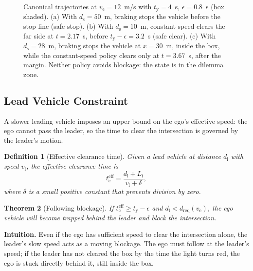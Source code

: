 \documentclass[conference, a4paper]{IEEEtran}
\theoremstyle{plain}
\newtheorem{theorem}{Theorem}
\newtheorem{definition}[theorem]{Definition}
\newcommand{\dreq}{d_{\mathrm{req}}}
\newcommand{\ds}{d_{\mathrm{s}}}
\newcommand{\dl}{d_{\mathrm{l}}}
\newcommand{\tred}{t_{\mathrm{y}}}
\newcommand{\teff}{t_{\mathrm{c}}^{\mathrm{eff}}}
\newcommand{\Li}{L_{\mathrm{i}}}
\newcommand{\ve}{v_{\mathrm{e}}}
\newcommand{\vl}{v_{\mathrm{l}}}
\begin{document}
\begin{figure}[t]
\caption{Canonical trajectories at $\ve = 12$~\si{m/s} with
$\tred = 4$~s, $\epsilon = 0.8$~s (box shaded). (a) With $\ds = 50$~m,
braking stops the vehicle before the stop line (safe stop). (b) With
$\ds = 10$~m, constant speed clears the far side at $t = 2.17$~s, before
$\tred - \epsilon = 3.2$~s (safe clear). (c) With $\ds = 28$~m, braking
stops the vehicle at $x = 30$~m, inside the box, while the constant-speed
policy clears only at $t = 3.67$~s, after the margin. Neither policy avoids
blockage: the state is in the dilemma zone.}
\label{fig:traj}
\end{figure}

\subsection{Lead Vehicle Constraint}
\label{subsec:lead}

A slower leading vehicle imposes an upper bound on the ego's effective speed:
the ego cannot pass the leader, so the time to clear the intersection is
governed by the leader's motion.

\begin{definition}[Effective clearance time]
\label{def:effclear}
Given a lead vehicle at distance $\dl$ with speed $\vl$, the effective
clearance time is
\begin{equation}
\teff = \frac{\dl + \Li}{\vl + \delta},
\label{eq:eff_clear}
\end{equation}
where $\delta$ is a small positive constant that prevents division by zero.
\end{definition}

\begin{theorem}[Following blockage]
\label{thm:follow}
If $\teff \geq \tred - \epsilon$ and $\dl < \dreq(\ve)$, the ego vehicle will
become trapped behind the leader and block the intersection.
\end{theorem}

\textbf{Intuition.} Even if the ego has sufficient speed to clear the
intersection alone, the leader's slow speed acts as a moving blockage. The
ego must follow at the leader's speed; if the leader has not cleared the box
by the time the light turns red, the ego is stuck directly behind it, still
inside the box.
\end{document}
